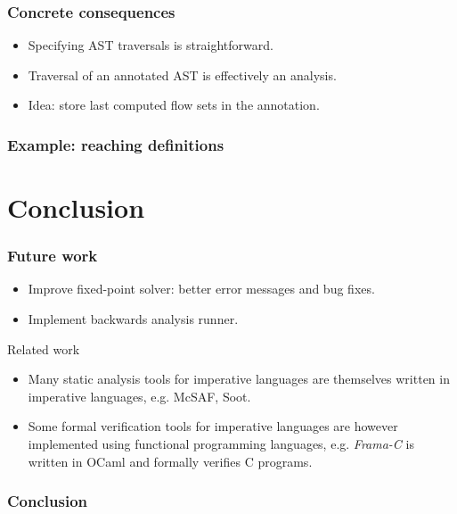 \documentclass{beamer}
\begin{document}
\begin{frame}
  \frametitle{Concrete consequences}

  \begin{itemize}
    \item Specifying AST traversals is straightforward.
    \item Traversal of an annotated AST is effectively an analysis.
    \item Idea: store last computed flow sets in the annotation.
  \end{itemize}
\end{frame}

\begin{frame}
  \frametitle{Example: reaching definitions}
\end{frame}

\section{Conclusion}

\begin{frame}
  \frametitle{Future work}

  \begin{itemize}
    \item Improve fixed-point solver: better error messages and bug fixes.
    \item Implement backwards analysis runner.
  \end{itemize}
\end{frame}

\begin{frame}
  \begin{block}{Related work}
    \begin{itemize}
      \item
        Many static analysis tools for imperative languages are themselves
        written in imperative languages, e.g. McSAF, Soot.
      \item
        Some formal verification tools for imperative languages are however
        implemented using functional programming languages, e.g. \emph{Frama-C}
        is written in OCaml and formally verifies C programs.
    \end{itemize}
  \end{block}
\end{frame}

\begin{frame}
  \frametitle{Conclusion}
\end{frame}
\end{document}
